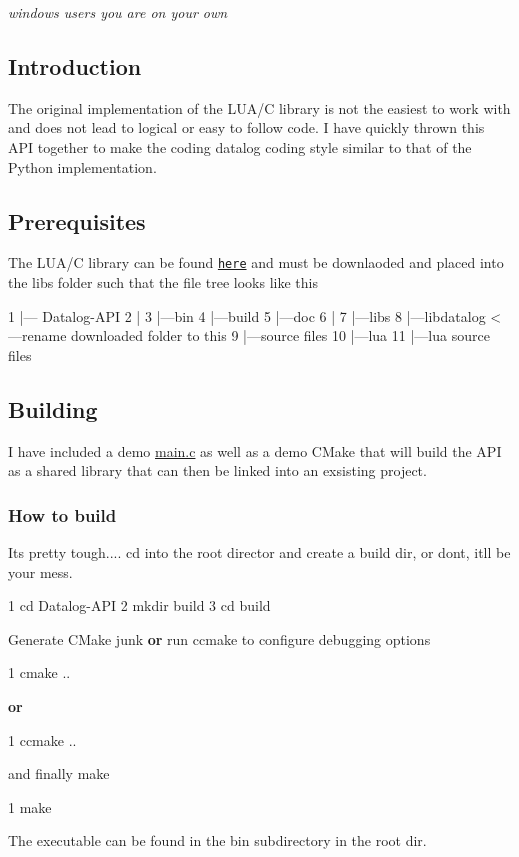 {\itshape windows users you are on your own}

\subsection*{Introduction}

The original implementation of the L\+U\+A/C library is not the easiest to work with and does not lead to logical or easy to follow code. I have quickly thrown this A\+PI together to make the coding datalog coding style similar to that of the Python implementation.

\subsection*{Prerequisites}

The L\+U\+A/C library can be found \href{http://datalog.sourceforge.net}{\tt here} and must be downlaoded and placed into the libs folder such that the file tree looks like this 
\begin{DoxyCode}
1 |--- Datalog-API  
2       |  
3       |---bin  
4       |---build  
5       |---doc  
6       |  
7       |---libs  
8            |---libdatalog <---rename downloaded folder to this  
9                |---source files  
10                |---lua  
11                     |---lua source files  
\end{DoxyCode}
 \subsection*{Building}

I have included a demo \hyperlink{main_8c}{main.\+c} as well as a demo C\+Make that will build the A\+PI as a shared library that can then be linked into an exsisting project.

\subsubsection*{How to build}

It\textquotesingle{}s pretty tough.... cd into the root director and create a build dir, or don\textquotesingle{}t, it\textquotesingle{}ll be your mess.


\begin{DoxyCode}
1 cd Datalog-API
2 mkdir build
3 cd build
\end{DoxyCode}
 Generate C\+Make junk {\bfseries or} run ccmake to configure debugging options 
\begin{DoxyCode}
1 cmake ..
\end{DoxyCode}
 {\bfseries or} 
\begin{DoxyCode}
1 ccmake ..
\end{DoxyCode}
 and finally make 
\begin{DoxyCode}
1 make
\end{DoxyCode}
 The executable can be found in the bin subdirectory in the root dir.

